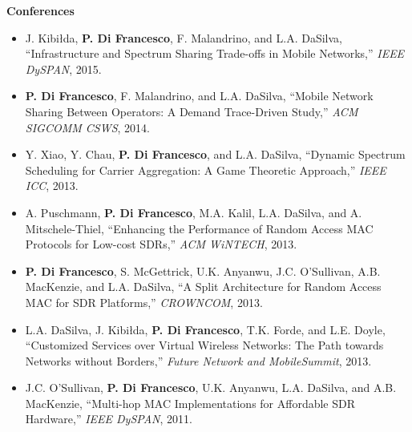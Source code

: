 \documentclass[11pt,a4paper]{article}
\begin{document}
\textbf{Conferences}
\begin{itemize}[nosep,leftmargin=*]
\item J. Kibi\l da, \textbf{P. Di Francesco}, F. Malandrino, and L.A. DaSilva, ``Infrastructure and Spectrum Sharing Trade-offs in Mobile Networks,'' \textit{IEEE DySPAN}, 2015.
\item \textbf{P. Di Francesco}, F. Malandrino, and L.A. DaSilva, ``Mobile Network Sharing Between Operators: A Demand Trace-Driven Study,'' \textit{ACM SIGCOMM CSWS}, 2014.
\item Y. Xiao, Y. Chau, \textbf{P. Di Francesco}, and L.A. DaSilva, ``Dynamic Spectrum Scheduling for Carrier Aggregation: A Game Theoretic Approach,'' \textit{IEEE ICC}, 2013.
\item A. Puschmann, \textbf{P. Di Francesco}, M.A. Kalil, L.A. DaSilva, and A. Mitschele-Thiel, ``Enhancing the Performance of Random Access MAC Protocols for Low-cost SDRs,'' \textit{ACM WiNTECH}, 2013.
\item \textbf{P. Di Francesco}, S. McGettrick, U.K. Anyanwu, J.C. O'Sullivan, A.B. MacKenzie, and L.A. DaSilva, ``A Split Architecture for Random Access MAC for SDR Platforms,'' \textit{CROWNCOM}, 2013.
\item L.A. DaSilva, J. Kibi\l da, \textbf{P. Di Francesco}, T.K. Forde, and L.E. Doyle, ``Customized Services over Virtual Wireless Networks: The Path towards Networks without Borders,'' \textit{Future Network and MobileSummit}, 2013.
\item J.C. O'Sullivan, \textbf{P. Di Francesco}, U.K. Anyanwu, L.A. DaSilva, and A.B. MacKenzie, ``Multi-hop MAC Implementations for Affordable SDR Hardware,'' \textit{IEEE DySPAN}, 2011.
\end{itemize}
\end{document}
